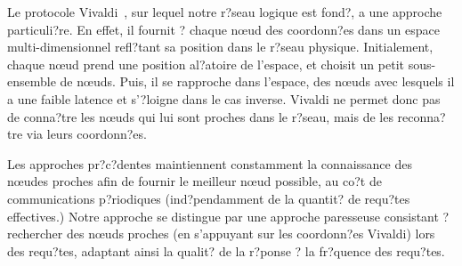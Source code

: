 Le protocole Vivaldi~\cite{dabek:2001:sigcomm04}, sur lequel notre r?seau logique est fond?,
a une approche particuli?re. En effet, il fournit ? chaque n\oe ud des
coordonn?es dans un espace multi-dimensionnel refl?tant sa position dans le
r?seau physique. Initialement, chaque n\oe ud prend une position al?atoire de
l'espace, et choisit un petit sous-ensemble de n\oe uds. Puis, il se rapproche
dans l'espace, des n\oe uds avec lesquels il a une faible latence et s'?loigne
dans le cas inverse. Vivaldi ne permet donc pas de conna?tre les n\oe uds qui
lui sont proches dans le r?seau, mais de les reconna?tre via leurs coordonn?es.

Les approches pr?c?dentes maintiennent constamment la connaissance des n\oe udes
proches afin de fournir le meilleur n\oe ud possible, au co?t de communications
p?riodiques (ind?pendamment de la quantit? de requ?tes effectives.) Notre
approche se distingue par une approche paresseuse consistant ? rechercher des
n\oe uds proches (en s'appuyant sur les coordonn?es Vivaldi) lors des requ?tes,
adaptant ainsi la qualit? de la r?ponse ? la fr?quence des requ?tes.

